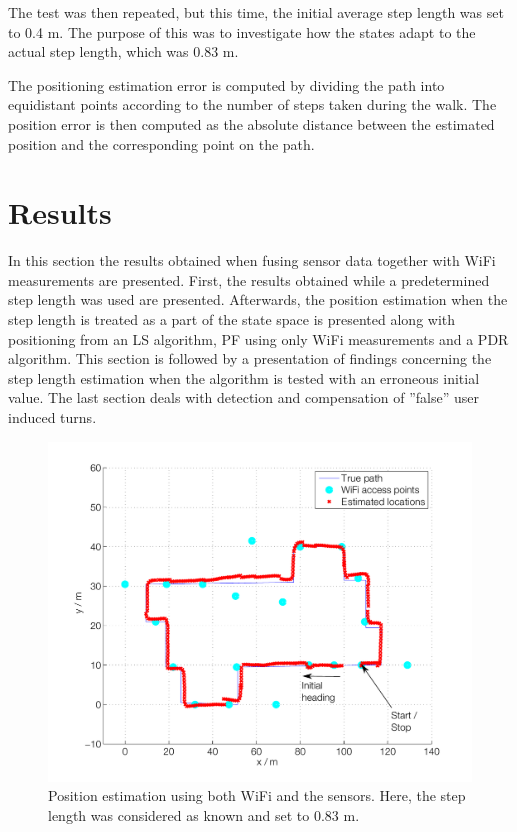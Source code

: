 \documentclass{LTHthesis}
\begin{document}
The test was then repeated, but this time, the initial average step length was set to 0.4 m. The purpose of this was to investigate how the states adapt to the actual step length, which was 0.83 m.

The positioning estimation error is computed by dividing the path into equidistant points according to the number of steps taken during the walk. The position error is then computed as the absolute distance between the estimated position  and  the corresponding point on the path. 
%
\section{Results}
%
In this section the results obtained when fusing sensor data together with WiFi measurements are presented. First, the results obtained while a predetermined step length was used are presented. Afterwards, the position estimation when the step length is treated as a part of the state space is presented along with positioning from an LS algorithm, PF using only WiFi measurements and a PDR algorithm. This section is followed by a presentation of findings concerning the step length estimation when the algorithm is tested with an erroneous initial value. The last section deals with detection and compensation of ''false'' user induced turns.   
%
\begin{figure}[!hbt]

\includegraphics[width=1\textwidth ]{images/sensor_fused/path_no_step_est}
\caption{Position estimation using both WiFi and the sensors. Here, the step length was considered as known and set to 0.83 m.}\label{path_no_step_est}
\end{figure}
\end{document}
